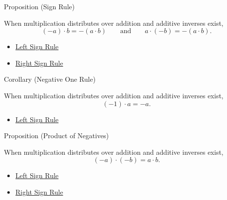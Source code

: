 \begin{propositionbox}{Proposition (Sign Rule)}
\begin{proposition}
\label{prop:sign-rule}
When multiplication distributes over addition and additive inverses exist,
\[
(-a)\cdot b=-(a\cdot b)
\qquad\text{and}\qquad
a\cdot(-b)=-(a\cdot b).
\]
\end{proposition}
\end{propositionbox}

\begin{dependencies}
\begin{itemize}
  \item \hyperref[prop:left-sign-rule]{Left Sign Rule}
  \item \hyperref[prop:right-sign-rule]{Right Sign Rule}
\end{itemize}
\end{dependencies}

\begin{corollarybox}{Corollary (Negative One Rule)}
\begin{corollary}
\label{cor:negative-one-rule}
When multiplication distributes over addition and additive inverses exist,
\[
(-1)\cdot a=-a.
\]
\end{corollary}
\end{corollarybox}

\begin{dependencies}
\begin{itemize}
  \item \hyperref[prop:left-sign-rule]{Left Sign Rule}
\end{itemize}
\end{dependencies}

\begin{propositionbox}{Proposition (Product of Negatives)}
\begin{proposition}
\label{prop:product-of-negatives}
When multiplication distributes over addition and additive inverses exist,
\[
(-a)\cdot(-b)=a\cdot b.
\]
\end{proposition}
\end{propositionbox}

\begin{dependencies}
\begin{itemize}
  \item \hyperref[prop:left-sign-rule]{Left Sign Rule}
  \item \hyperref[prop:right-sign-rule]{Right Sign Rule}
\end{itemize}
\end{dependencies}

